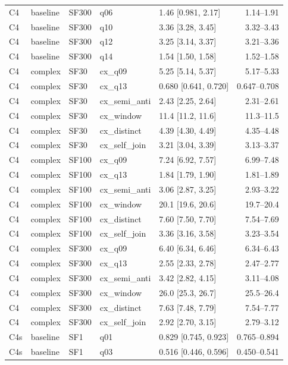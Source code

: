 \begin{longtable}{lllllr}
C4 & baseline & SF300 & q06 & 1.46 [0.981, 2.17] & 1.14--1.91 \\
C4 & baseline & SF300 & q10 & 3.36 [3.28, 3.45] & 3.32--3.43 \\
C4 & baseline & SF300 & q12 & 3.25 [3.14, 3.37] & 3.21--3.36 \\
C4 & baseline & SF300 & q14 & 1.54 [1.50, 1.58] & 1.52--1.58 \\
C4 & complex & SF30 & cx\_q09 & 5.25 [5.14, 5.37] & 5.17--5.33 \\
C4 & complex & SF30 & cx\_q13 & 0.680 [0.641, 0.720] & 0.647--0.708 \\
C4 & complex & SF30 & cx\_semi\_anti & 2.43 [2.25, 2.64] & 2.31--2.61 \\
C4 & complex & SF30 & cx\_window & 11.4 [11.2, 11.6] & 11.3--11.5 \\
C4 & complex & SF30 & cx\_distinct & 4.39 [4.30, 4.49] & 4.35--4.48 \\
C4 & complex & SF30 & cx\_self\_join & 3.21 [3.04, 3.39] & 3.13--3.37 \\
C4 & complex & SF100 & cx\_q09 & 7.24 [6.92, 7.57] & 6.99--7.48 \\
C4 & complex & SF100 & cx\_q13 & 1.84 [1.79, 1.90] & 1.81--1.89 \\
C4 & complex & SF100 & cx\_semi\_anti & 3.06 [2.87, 3.25] & 2.93--3.22 \\
C4 & complex & SF100 & cx\_window & 20.1 [19.6, 20.6] & 19.7--20.4 \\
C4 & complex & SF100 & cx\_distinct & 7.60 [7.50, 7.70] & 7.54--7.69 \\
C4 & complex & SF100 & cx\_self\_join & 3.36 [3.16, 3.58] & 3.23--3.54 \\
C4 & complex & SF300 & cx\_q09 & 6.40 [6.34, 6.46] & 6.34--6.43 \\
C4 & complex & SF300 & cx\_q13 & 2.55 [2.33, 2.78] & 2.47--2.77 \\
C4 & complex & SF300 & cx\_semi\_anti & 3.42 [2.82, 4.15] & 3.11--4.08 \\
C4 & complex & SF300 & cx\_window & 26.0 [25.3, 26.7] & 25.5--26.4 \\
C4 & complex & SF300 & cx\_distinct & 7.63 [7.48, 7.79] & 7.54--7.77 \\
C4 & complex & SF300 & cx\_self\_join & 2.92 [2.70, 3.15] & 2.79--3.12 \\
C4s & baseline & SF1 & q01 & 0.829 [0.745, 0.923] & 0.765--0.894 \\
C4s & baseline & SF1 & q03 & 0.516 [0.446, 0.596] & 0.450--0.541 \\

\end{longtable}
